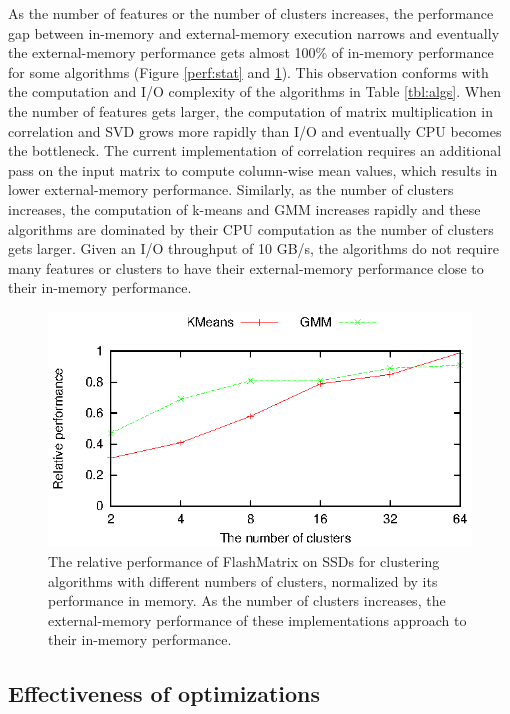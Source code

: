 As the number of features or the number of clusters increases,
the performance gap between in-memory and external-memory execution
narrows and eventually the external-memory performance gets almost 100\%
of in-memory performance for some algorithms (Figure \ref{perf:stat} and
\ref{perf:clust}).
This observation conforms with the computation and I/O complexity of
the algorithms in Table \ref{tbl:algs}. When the number of features
gets larger, the computation of matrix multiplication in
correlation and SVD grows more rapidly than I/O and eventually CPU becomes
the bottleneck. The current implementation of correlation requires an additional
pass on the input matrix to compute column-wise mean values, which results in
lower external-memory performance. Similarly, as the number of clusters
increases, the computation of k-means and GMM increases rapidly and
these algorithms are dominated by their CPU computation as the number
of clusters gets larger. Given an I/O throughput of 10 GB/s, the algorithms
do not require many features or clusters to have their external-memory
performance close to their in-memory performance.

\begin{figure}
	\begin{center}
		\footnotesize
		\includegraphics{FlashMatrix_figs/IM-vs-EM-clust.eps}
		\caption{The relative performance of FlashMatrix on SSDs for
			clustering algorithms with different numbers of clusters, normalized
			by its performance in memory. As the number of clusters increases,
			the external-memory performance of these implementations approach
			to their in-memory performance.}
		\label{perf:clust}
	\end{center}
\end{figure}

\subsection{Effectiveness of optimizations}

